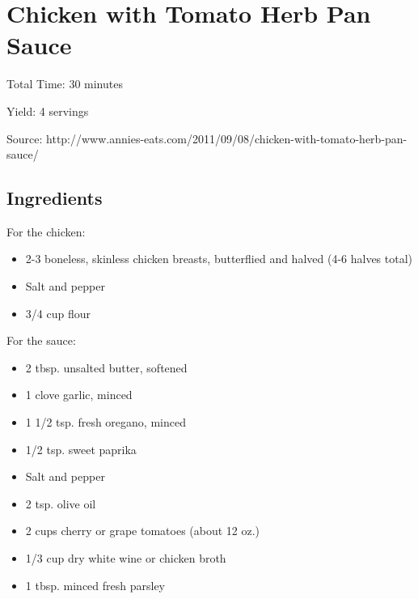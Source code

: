 \section{Chicken with Tomato Herb Pan Sauce}

\begin{center}
\noindent Total Time: 30 minutes

\noindent Yield: 4 servings

\vspace{1em}

Source: http://www.annies-eats.com/2011/09/08/chicken-with-tomato-herb-pan-sauce/
\end{center}

\subsection{Ingredients}
For the chicken:
\begin{itemize}
    \item 2-3 boneless, skinless chicken breasts, butterflied and halved (4-6 halves total)
    \item Salt and pepper
    \item 3/4 cup flour
\end{itemize}

\noindent For the sauce:
\begin{itemize}
    \item 2 tbsp. unsalted butter, softened
    \item 1 clove garlic, minced
    \item 1 1/2 tsp. fresh oregano, minced
    \item 1/2 tsp. sweet paprika
    \item Salt and pepper
    \item 2 tsp. olive oil
    \item 2 cups cherry or grape tomatoes (about 12 oz.)
    \item 1/3 cup dry white wine or chicken broth
    \item 1 tbsp. minced fresh parsley
\end{itemize}


